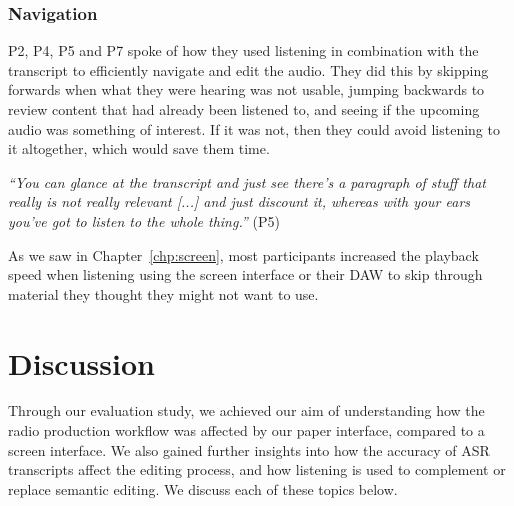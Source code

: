 \subsubsection{Navigation}



P2, P4, P5 and P7 spoke of how they used listening in combination with the transcript to efficiently navigate and edit
the audio. They did this by skipping forwards when what they were hearing was not usable, jumping backwards to review
content that had already been listened to, and seeing if the upcoming audio was something of interest.  If it was not,
then they could avoid listening to it altogether, which would save them time.

\textit{``You can glance at the transcript and just see there's a paragraph of stuff that really is not really relevant
[...] and just discount it, whereas with your ears you've got to listen to the whole thing.''} (P5) 

As we saw in Chapter~\ref{chp:screen}, most participants increased the playback speed when listening using the screen
interface or their DAW to skip through material they thought they might not want to use.




\section{Discussion}\label{sec:paper-discussion}

Through our evaluation study, we achieved our aim of understanding how the radio production workflow was affected by
our paper interface, compared to a screen interface. We also gained further insights into how the accuracy of ASR
transcripts affect the editing process, and how listening is used to complement or replace semantic editing.
We discuss each of these topics below.

